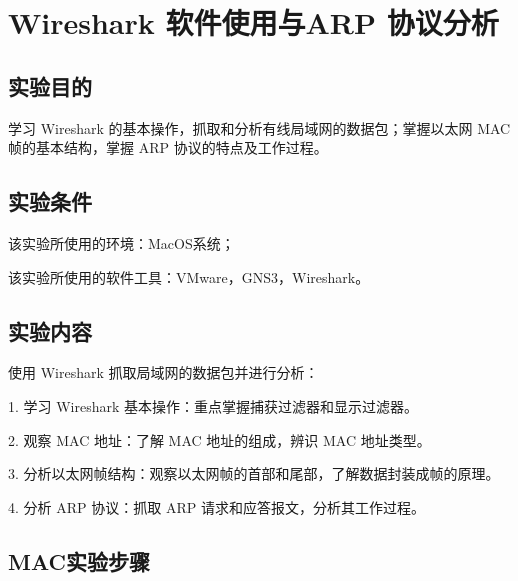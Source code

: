 \documentclass[a4paper,12pt]{report}
\begin{document}
\chapter*{Wireshark 软件使用与ARP 协议分析
}
\setcounter{page}{1}
\begin{spacing}{1.5}
\songti{}

\section{实验目的}
学习 Wireshark 的基本操作，抓取和分析有线局域网的数据包；掌握以太网 MAC 帧的基本结构，掌握 ARP 协议的特点及工作过程。

\section{实验条件}
该实验所使用的环境：MacOS系统；

该实验所使用的软件工具：VMware，GNS3，Wireshark。

\section{实验内容}
使用 Wireshark 抓取局域网的数据包并进行分析：

1. 学习 Wireshark 基本操作：重点掌握捕获过滤器和显示过滤器。

2. 观察 MAC 地址：了解 MAC 地址的组成，辨识 MAC 地址类型。

3. 分析以太网帧结构：观察以太网帧的首部和尾部，了解数据封装成帧的原理。

4. 分析 ARP 协议：抓取 ARP 请求和应答报文，分析其工作过程。

\section{MAC实验步骤}

\end{spacing}
\end{document}
